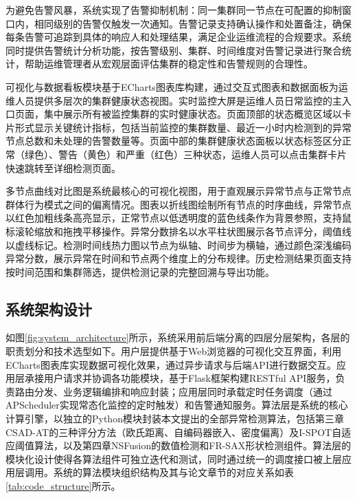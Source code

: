 为避免告警风暴，系统实现了告警抑制机制：同一集群同一节点在可配置的抑制窗口内，相同级别的告警仅触发一次通知。告警记录支持确认操作和处置备注，确保每条告警可追踪到具体的响应人和处理结果，满足企业运维流程的合规要求。系统同时提供告警统计分析功能，按告警级别、集群、时间维度对告警记录进行聚合统计，帮助运维管理者从宏观层面评估集群的稳定性和告警规则的合理性。

可视化与数据看板模块基于ECharts图表库构建，通过交互式图表和数据面板为运维人员提供多层次的集群健康状态视图。实时监控大屏是运维人员日常监控的主入口页面，集中展示所有被监控集群的实时健康状态。页面顶部的状态概览区域以卡片形式显示关键统计指标，包括当前监控的集群数量、最近一小时内检测到的异常节点总数和未处理的告警数量等。页面中部的集群健康状态面板以状态标签区分正常（绿色）、警告（黄色）和严重（红色）三种状态，运维人员可以点击集群卡片快速跳转至详细检测页面。

多节点曲线对比图是系统最核心的可视化视图，用于直观展示异常节点与正常节点群体行为模式之间的偏离情况。图表以折线图绘制所有节点的时序曲线，异常节点以红色加粗线条高亮显示，正常节点以低透明度的蓝色线条作为背景参照，支持鼠标滚轮缩放和拖拽平移操作。异常分数排名以水平柱状图展示各节点评分，阈值线以虚线标记。检测时间线热力图以节点为纵轴、时间步为横轴，通过颜色深浅编码异常分数，展示异常在时间和节点两个维度上的分布规律。历史检测结果页面支持按时间范围和集群筛选，提供检测记录的完整回溯与导出功能。

\subsection{系统架构设计}

如图\ref{fig:system_architecture}所示，系统采用前后端分离的四层分层架构，各层的职责划分和技术选型如下。用户层提供基于Web浏览器的可视化交互界面，利用ECharts图表库实现数据可视化效果，通过异步请求与后端API进行数据交互。应用层承接用户请求并协调各功能模块，基于Flask框架构建RESTful API服务，负责路由分发、业务逻辑编排和响应封装；应用层同时承载定时任务调度（通过APScheduler实现常态化监控的定时触发）和告警通知服务。算法层是系统的核心计算引擎，以独立的Python模块封装本文提出的全部异常检测算法，包括第三章CSAD-AT的三种评分方法（欧氏距离、自编码器嵌入、密度偏离）及I-SPOT自适应阈值算法，以及第四章NSFusion的数值检测和FR-SAX形状检测组件。算法层的模块化设计使得各算法组件可独立迭代和测试，同时通过统一的调度接口被上层应用层调用。系统的算法模块组织结构及其与论文章节的对应关系如表\ref{tab:code_structure}所示。

